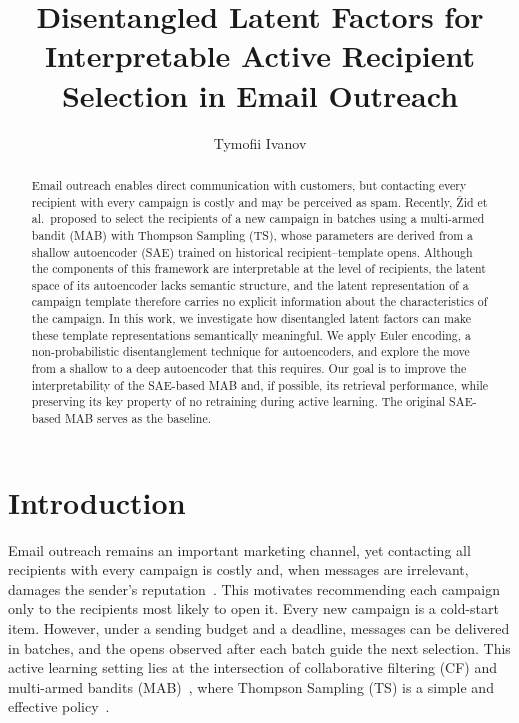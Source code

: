 \documentclass[sigconf]{acmart}
\begin{document}
\title{Disentangled Latent Factors for Interpretable Active Recipient Selection in Email Outreach}

\author{Tymofii Ivanov}

\begin{abstract}
  Email outreach enables direct communication with customers, but contacting
  every recipient with every campaign is costly and may be perceived as spam.
  Recently, \v{Z}id et al.\ proposed to select the recipients of a new campaign
  in batches using a multi-armed bandit (MAB) with Thompson Sampling (TS), whose
  parameters are derived from a shallow autoencoder (SAE) trained on historical
  recipient--template opens. Although the components of this framework are
  interpretable at the level of recipients, the latent space of its autoencoder
  lacks semantic structure, and the latent representation of a campaign template
  therefore carries no explicit information about the characteristics of the
  campaign. In this work, we investigate how disentangled latent factors can
  make these template representations semantically meaningful. We apply Euler
  encoding, a non-probabilistic disentanglement technique for autoencoders, and
  explore the move from a shallow to a deep autoencoder that this requires. Our
  goal is to improve the interpretability of the SAE-based MAB and, if possible, its
  retrieval performance, while preserving its key property of no retraining
  during active learning. The original SAE-based MAB serves as the baseline.
\end{abstract}


\maketitle

\section{Introduction}

Email outreach remains an important marketing channel, yet contacting all
recipients with every campaign is costly and, when messages are irrelevant,
damages the sender's reputation~\cite{zid2025active}. This motivates
recommending each campaign only to the recipients most likely to open it. Every
new campaign is a cold-start item. However, under a sending budget and a
deadline, messages can be delivered in batches, and the opens observed after
each batch guide the next selection. This active learning setting lies at the
intersection of collaborative filtering (CF) and multi-armed bandits
(MAB)~\cite{zhao2013interactive}, where Thompson Sampling (TS) is a simple and
effective policy~\cite{russo2018tutorial}.
\end{document}
